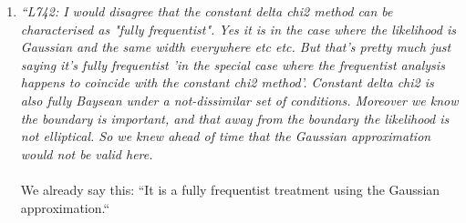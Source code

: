 \begin{enumerate}
The plots have been found to be incorrect. The -1$\sigma$ fit was done
for a toy experiment created at the +1$\sigma$ best fit point, rather
than the test point. This caused the asymmetric errors. The plots have
been updated in v5 of the note.





\vspace{5 mm}
\item
{\em
	``L742:
I would disagree that the constant delta chi2 method can be characterised as "fully frequentist".  Yes it is in the case where the likelihood is Gaussian and the same width everywhere etc etc. But that's pretty much just saying it's fully frequentist 'in the special case where the frequentist analysis happens to coincide with the constant chi2 method'.  Constant delta chi2 is also fully Baysean under a not-dissimilar set of conditions.   Moreover we know the boundary is important, and that away from the boundary the likelihood is not elliptical.  So we knew ahead of time that the Gaussian approximation would not be valid here.
}\\
\\
We already say this: ``It is a fully frequentist treatment using the Gaussian approximation.``


\end{enumerate}
